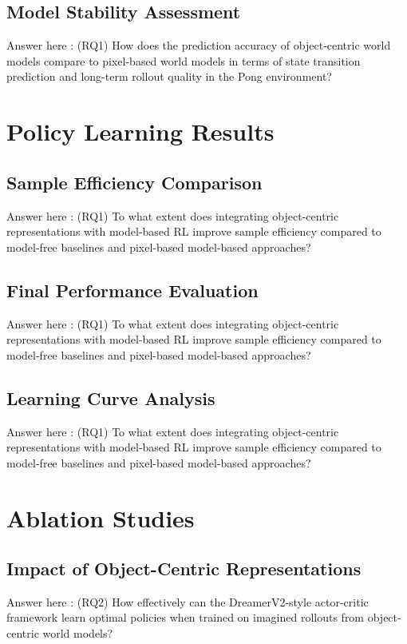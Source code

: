 \documentclass[
	english,
	ruledheaders=section,
	class=report,
	thesis={type=master},
	accentcolor=9c,
	custommargins=true,
	marginpar=false,
	parskip=half-,
	fontsize=11pt,
]{tudapub}
\begin{document}
\subsection{Model Stability Assessment}
\label{subsec:stability}
Answer here : (RQ1) How does the prediction accuracy of object-centric world models compare to pixel-based world models in terms of state transition prediction and long-term rollout quality in the Pong environment?

\section{Policy Learning Results}
\label{sec:policy_results}

\subsection{Sample Efficiency Comparison}
\label{subsec:sample_efficiency_comp}
Answer here : (RQ1) To what extent does integrating object-centric representations with model-based RL improve sample efficiency compared to model-free baselines and pixel-based model-based approaches?

\subsection{Final Performance Evaluation}
\label{subsec:final_performance}
Answer here : (RQ1) To what extent does integrating object-centric representations with model-based RL improve sample efficiency compared to model-free baselines and pixel-based model-based approaches?

\subsection{Learning Curve Analysis}
\label{subsec:learning_curves}
Answer here : (RQ1) To what extent does integrating object-centric representations with model-based RL improve sample efficiency compared to model-free baselines and pixel-based model-based approaches?

\section{Ablation Studies}
\label{sec:ablation_studies}

\subsection{Impact of Object-Centric Representations}
\label{subsec:oc_impact}
Answer here : (RQ2) How effectively can the DreamerV2-style actor-critic framework learn optimal policies when trained on imagined rollouts from object-centric world models?
\end{document}
